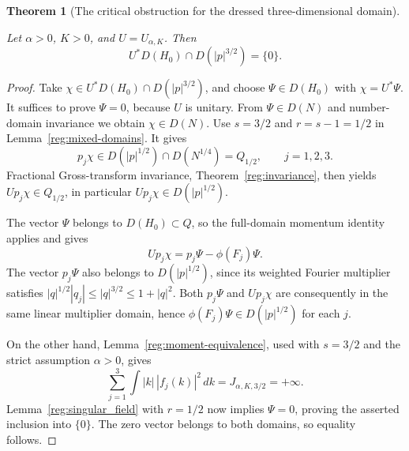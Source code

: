 \documentclass[11pt,a4paper]{article}
\newtheorem{theorem}{Theorem}[section]
\theoremstyle{definition}
\theoremstyle{remark}
\newcommand{\proofid}[1]{\par\smallskip{\normalfont\scriptsize\color{inkblue}Stable ID: \nolinkurl{#1}}\par\smallskip}
\begin{document}
\begin{theorem}[The critical obstruction for the dressed three-dimensional domain]
\label{reg:negative}
\proofid{reg:negative}
\par{}\par\smallskip

Let \(\alpha>0\), \(K>0\), and \(U=U_{\alpha,K}\). Then
\begin{equation}
 U^*D(H_0)\cap D(|p|^{3/2})=\{0\}.
 \label{reg:negative-conclusion}
\end{equation}
\end{theorem}
\begin{proof}
Take \(\chi\in U^*D(H_0)\cap D(|p|^{3/2})\), and choose
\(\Psi\in D(H_0)\) with \(\chi=U^*\Psi\). It suffices to prove
\(\Psi=0\), because \(U\) is unitary. From \(\Psi\in D(N)\) and
number-domain invariance we obtain \(\chi\in D(N)\).
Use \(s=3/2\) and \(r=s-1=1/2\) in
Lemma~\ref{reg:mixed-domains}. It gives
\[
 p_j\chi\in D(|p|^{1/2})\cap D(N^{1/4})=Q_{1/2},
 \qquad j=1,2,3.
\]
Fractional Gross-transform invariance, Theorem~\ref{reg:invariance},
then yields \(Up_j\chi\in Q_{1/2}\), in particular
\(Up_j\chi\in D(|p|^{1/2})\).

The vector \(\Psi\) belongs to \(D(H_0)\subset Q\), so the full-domain
momentum identity applies and gives
\[
 Up_j\chi=p_j\Psi-\phi(F_j)\Psi.
\]
The vector \(p_j\Psi\) also belongs to \(D(|p|^{1/2})\), since its
weighted Fourier multiplier satisfies
\(|q|^{1/2}|q_j|\leq |q|^{3/2}\leq1+|q|^2\).
Both \(p_j\Psi\) and \(Up_j\chi\) are consequently in the same
linear multiplier domain, hence
\(\phi(F_j)\Psi\in D(|p|^{1/2})\) for each \(j\).

On the other hand, Lemma~\ref{reg:moment-equivalence}, used with
\(s=3/2\) and the strict assumption \(\alpha>0\), gives
\[
 \sum_{j=1}^3\int |k|\,|f_j(k)|^2\,dk
       =J_{\alpha,K,3/2}=+\infty.
\]
Lemma~\ref{reg:singular_field} with \(r=1/2\) now implies
\(\Psi=0\), proving the asserted inclusion into \(\{0\}\).
The zero vector belongs to both domains, so equality follows.
\end{proof}
\end{document}
